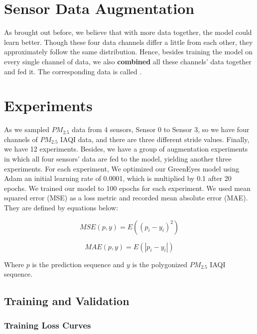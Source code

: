 \section{Sensor Data Augmentation}

As brought out before, we believe that with more data together, the model could learn better. Though these four data channels differ a little from each other, they approximately follow the same distribution. Hence, besides training the model on every single channel of  data, we also \textbf{combined} all these channels' data together and fed it. The corresponding data is called .

\section{Experiments}
As we sampled $PM_{2.5}$ data from 4 sensors, Sensor 0 to Sensor 3, so we have four channels of $PM_{2.5}$ IAQI data, and there are three different stride values. Finally, we have 12 experiments. Besides, we have a group of augmentation experiments in which all four sensors' data are fed to the model, yielding another three experiments.
For each experiment, We optimized our GreenEyes model using Adam \cite{kingma2017adam} an initial learning rate of 0.0001, which is multiplied by 0.1 after 20 epochs. We trained our model to 100 epochs for each experiment.
We used mean squared error (MSE) as a loss metric and recorded mean absolute error (MAE). They are defined by equations below:

\begin{equation}
    MSE(p, y)=E((p_i-y_i)^2)
\end{equation}

\begin{equation}
    MAE(p, y)=E(|p_i-y_i|)
\end{equation}

Where $p$ is the prediction sequence and $y$ is the polygonized $PM_{2.5}$ IAQI sequence.


\subsection{Training and Validation} %

\subsubsection{Training Loss Curves}

